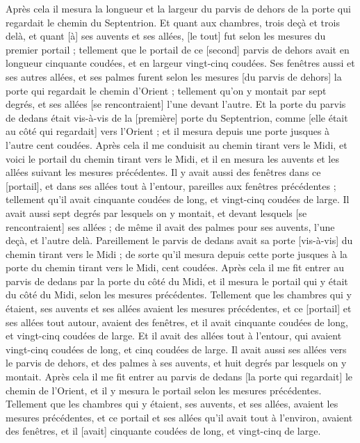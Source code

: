 \begin{multicols}{2}
Après cela il mesura la longueur et la largeur du parvis de dehors de la porte qui regardait le chemin du Septentrion.
Et quant aux chambres, trois deçà et trois delà, et quant [à] ses auvents et ses allées, [le tout] fut selon les mesures du premier portail ; tellement que le portail de ce [second] parvis de dehors avait en longueur cinquante coudées, et en largeur vingt-cinq coudées.
Ses fenêtres aussi et ses autres allées, et ses palmes furent selon les mesures [du parvis de dehors] la porte qui regardait le chemin d'Orient ; tellement qu'on y montait par sept degrés, et ses allées [se rencontraient] l'une devant l'autre.
Et la porte du parvis de dedans était vis-à-vis de la [première] porte du Septentrion, comme [elle était au côté qui regardait] vers l'Orient ; et il mesura depuis une porte jusques à l'autre cent coudées.
Après cela il me conduisit au chemin tirant vers le Midi, et voici le portail du chemin tirant vers le Midi, et il en mesura les auvents et les allées suivant les mesures précédentes.
Il y avait aussi des fenêtres dans ce [portail], et dans ses allées tout à l'entour, pareilles aux fenêtres précédentes ; tellement qu'il avait cinquante coudées de long, et vingt-cinq coudées de large.
Il avait aussi sept degrés par lesquels on y montait, et devant lesquels [se rencontraient] ses allées ; de même il avait des palmes pour ses auvents, l'une deçà, et l'autre delà.
Pareillement le parvis de dedans avait sa porte [vis-à-vis] du chemin tirant vers le Midi ; de sorte qu'il mesura depuis cette porte jusques à la porte du chemin tirant vers le Midi, cent coudées.
Après cela il me fit entrer au parvis de dedans par la porte du côté du Midi, et il mesura le portail qui y était du côté du Midi, selon les mesures précédentes.
Tellement que les chambres qui y étaient, ses auvents et ses allées avaient les mesures précédentes, et ce [portail] et ses allées tout autour, avaient des fenêtres, et il avait cinquante coudées de long, et vingt-cinq coudées de large.
Et il avait des allées tout à l'entour, qui avaient vingt-cinq coudées de long, et cinq coudées de large.
Il avait aussi ses allées vers le parvis de dehors, et des palmes à ses auvents, et huit degrés par lesquels on y montait.
Après cela il me fit entrer au parvis de dedans [la porte qui regardait] le chemin de l'Orient, et il y mesura le portail selon les mesures précédentes.
Tellement que les chambres qui y étaient, ses auvents, et ses allées, avaient les mesures précédentes, et ce portail et ses allées qu'il avait tout à l'environ, avaient des fenêtres, et il [avait] cinquante coudées de long, et vingt-cinq de large.

\end{multicols}
